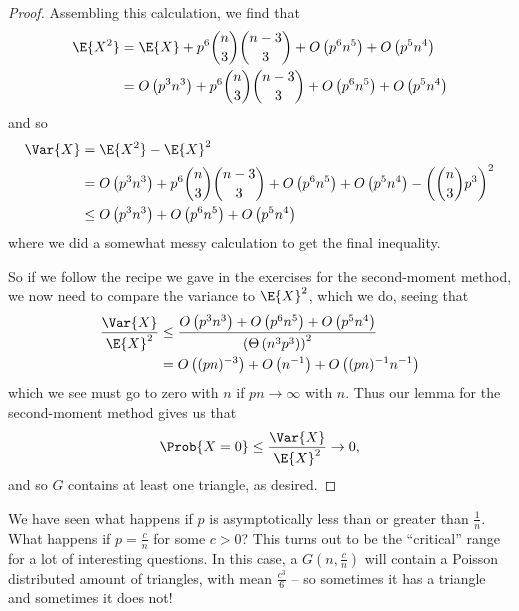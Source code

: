 \documentclass[nobib]{tufte-handout}
\begin{document}
\begin{proposition}
\begin{proof}
    Assembling this calculation, we find that
    \begin{align*}
      \E{X^2} &= \E{X} + p^6\binom{n}{3}\binom{n-3}{3} + O\left(p^6 n^5\right) + O\left(p^5 n^4\right)\\
      &= O\left(p^3 n^3\right) + p^6\binom{n}{3}\binom{n-3}{3} + O\left(p^6 n^5\right) + O\left(p^5 n^4\right)
    \end{align*}
    and so
    \begin{align*}
      \Var{X} &= \E{X^2} - \E{X}^2\\
      &= O\left(p^3 n^3\right) + p^6\binom{n}{3}\binom{n-3}{3} + O\left(p^6 n^5\right) + O\left(p^5 n^4\right) - \left(\binom{n}{3} p^3\right)^2\\
      &\leq O\left(p^3 n^3\right) + O\left(p^6 n^5\right) + O\left(p^5 n^4\right)
    \end{align*}
    where we did a somewhat messy calculation to get the final inequality.

    So if we follow the recipe we gave in the exercises for the second-moment method, we now need to compare the variance to $\E{X}^2$, which we do, seeing that
    \begin{align*}
      \frac{\Var{X}}{\E{X}^2} &\leq \frac{O\left(p^3 n^3\right) + O\left(p^6 n^5\right) + O\left(p^5 n^4\right)}{\left(\Theta\left(n^3 p^3\right)\right)^2}\\
      &= O\left((pn)^{-3}\right) + O\left(n^{-1}\right) + O\left((pn)^{-1}n^{-1}\right)
    \end{align*}
    which we see must go to zero with $n$ if $pn \to \infty$ with $n$. Thus our lemma for the second-moment method gives us that
    $$\Prob{X = 0} \leq \frac{\Var{X}}{\E{X}^2} \to 0,$$
    and so $G$ contains at least one triangle, as desired.
  \end{proof}
\end{proposition}

\begin{remark}
  We have seen what happens if $p$ is asymptotically less than or greater than $\frac{1}{n}$. What happens if $p = \frac{c}{n}$ for some $c>0$? This turns out to be the ``critical'' range for a lot of interesting questions. In this case, a $G\left(n, \frac{c}{n}\right)$ will contain a Poisson distributed amount of triangles, with mean $\frac{c^3}{6}$ -- so sometimes it has a triangle and sometimes it does not!
\end{remark}
\end{document}
